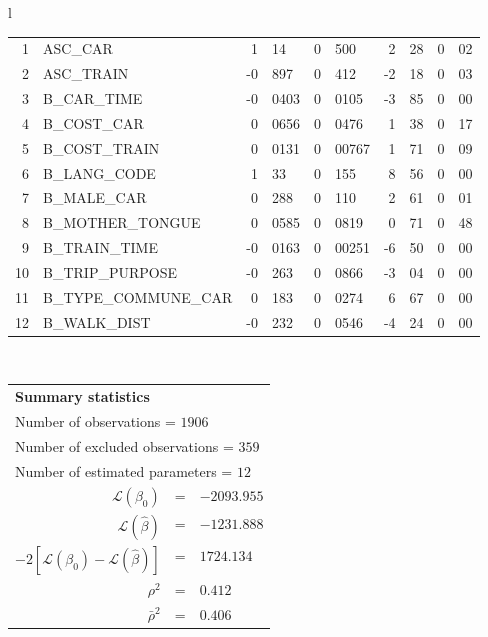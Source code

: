 \begin{tabular}{l}
\begin{tabular}{rlr@{.}lr@{.}lr@{.}lr@{.}l}
1 & ASC_CAR & 1&14 & 0&500 & 2&28 & 0&02\\
2 & ASC_TRAIN & -0&897 & 0&412 & -2&18 & 0&03\\
3 & B_CAR_TIME & -0&0403 & 0&0105 & -3&85 & 0&00\\
4 & B_COST_CAR & 0&0656 & 0&0476 & 1&38 & 0&17\\
5 & B_COST_TRAIN & 0&0131 & 0&00767 & 1&71 & 0&09\\
6 & B_LANG_CODE & 1&33 & 0&155 & 8&56 & 0&00\\
7 & B_MALE_CAR & 0&288 & 0&110 & 2&61 & 0&01\\
8 & B_MOTHER_TONGUE & 0&0585 & 0&0819 & 0&71 & 0&48\\
9 & B_TRAIN_TIME & -0&0163 & 0&00251 & -6&50 & 0&00\\
10 & B_TRIP_PURPOSE & -0&263 & 0&0866 & -3&04 & 0&00\\
11 & B_TYPE_COMMUNE_CAR & 0&183 & 0&0274 & 6&67 & 0&00\\
12 & B_WALK_DIST & -0&232 & 0&0546 & -4&24 & 0&00\\
\hline
\end{tabular}
\\
\begin{tabular}{rcl}
\multicolumn{3}{l}{\bf Summary statistics}\\
\multicolumn{3}{l}{ Number of observations = $1906$} \\
\multicolumn{3}{l}{ Number of excluded observations = $359$} \\
\multicolumn{3}{l}{ Number of estimated  parameters = $12$} \\
 $\mathcal{L}(\beta_0)$ &=&  $-2093.955$ \\
 $\mathcal{L}(\hat{\beta})$ &=& $-1231.888 $  \\
 $-2[\mathcal{L}(\beta_0) -\mathcal{L}(\hat{\beta})]$ &=& $1724.134$ \\
    $\rho^2$ &=&   $0.412$ \\
    $\bar{\rho}^2$ &=&    $0.406$ \\
\end{tabular}
  \end{tabular}
